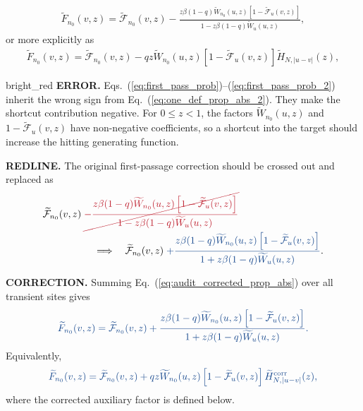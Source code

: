 \documentclass[10pt, hidelinks, superscriptaddress, amsmath, amssymb, aps, pre]{revtex4-2}
\newcommand{\auditlabel}[1]{\textbf{\textcolor{audit_blue}{#1}}}
\newcommand{\auditoriginal}[1]{\textcolor{bright_red}{#1}}
\newcommand{\auditcorrected}[1]{\textcolor{audit_blue}{#1}}
\newcommand{\auditmathwrong}[1]{\textcolor{bright_red}{\cancel{#1}}}
\newcommand{\auditarrow}{\quad\Longrightarrow\quad}
\begin{document}
\begin{align}
\widetilde{F}_{n_0}(v,z)=\widetilde{\mathcal{F}}_{n_0}(v,z)-\frac{z\beta (1-q)\widetilde{W}_{n_0}(u,z)\left[1-\widetilde{\mathcal{F}}_{u}(v,z)\right]}{1-z\beta(1-q)\widetilde{W}_{u}(u,z)},
\label{eq:first_pass_prob}
\end{align}
or more explicitly as
\begin{align}
\widetilde{F}_{n_0}(v,z)=\widetilde{\mathcal{F}}_{n_0}(v,z)-qz\widetilde{W}_{n_0}(u,z)\left[1-\widetilde{\mathcal{F}}_{u}(v,z)\right] \widetilde{H}_{N,|u-v|}(z),
\label{eq:first_pass_prob_2}
\end{align}
\begin{auditbox}{bright_red}
\auditlabel{ERROR.}  Eqs.~(\ref{eq:first_pass_prob})--(\ref{eq:first_pass_prob_2})
inherit the wrong sign from Eq.~(\ref{eq:one_def_prop_abs_2}).  They make the
shortcut contribution negative.  For $0\leq z<1$, the factors
$\widetilde W_{n_0}(u,z)$ and $1-\widetilde{\mathcal F}_u(v,z)$ have
non-negative coefficients, so a shortcut into the target should increase the
hitting generating function.

\auditlabel{REDLINE.}  The original first-passage correction should be crossed
out and replaced as
\begin{align}
\widetilde{\mathcal F}_{n_0}(v,z)
\;&\auditoriginal{
\auditmathwrong{-\frac{z\beta(1-q)\widetilde W_{n_0}(u,z)
\left[1-\widetilde{\mathcal F}_u(v,z)\right]}
{1-z\beta(1-q)\widetilde W_u(u,z)}}}
\nonumber\\
&\auditarrow
\widetilde{\mathcal F}_{n_0}(v,z)
\;\auditcorrected{
+\frac{z\beta(1-q)\widetilde W_{n_0}(u,z)
\left[1-\widetilde{\mathcal F}_u(v,z)\right]}
{1+z\beta(1-q)\widetilde W_u(u,z)}} .
\label{eq:audit_redline_first_passage}
\end{align}

\auditlabel{CORRECTION.}  Summing Eq.~(\ref{eq:audit_corrected_prop_abs}) over
all transient sites gives
\begin{align}
\auditcorrected{
\widetilde{F}_{n_0}(v,z)=\widetilde{\mathcal F}_{n_0}(v,z)
+\frac{z\beta(1-q)\widetilde W_{n_0}(u,z)
\left[1-\widetilde{\mathcal F}_u(v,z)\right]}
{1+z\beta(1-q)\widetilde W_u(u,z)}.}
\label{eq:audit_corrected_first_passage}
\end{align}
Equivalently,
\begin{align}
\auditcorrected{
\widetilde{F}_{n_0}(v,z)=\widetilde{\mathcal F}_{n_0}(v,z)
+qz\widetilde W_{n_0}(u,z)
\left[1-\widetilde{\mathcal F}_u(v,z)\right]
\widetilde H^{\rm corr}_{N,|u-v|}(z),}
\label{eq:audit_corrected_first_passage_H}
\end{align}
where the corrected auxiliary factor is defined below.
\end{auditbox}
\end{document}

